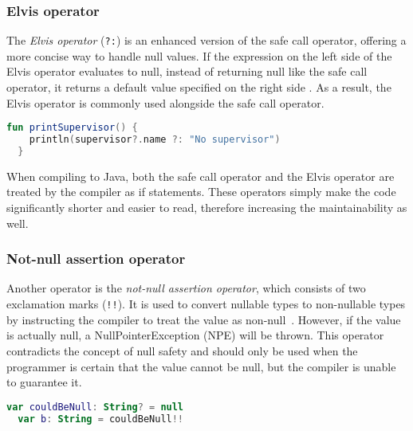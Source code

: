 \documentclass[a4paper, 11pt]{article}
\begin{document}
\subsubsection{Elvis operator}
The \textit{Elvis operator} (\texttt{?:}) is an enhanced version of the safe call operator, offering a more concise way to handle null values. If the expression on the left side of the Elvis operator evaluates to null, instead of returning null like the safe call operator, it returns a default value specified on the right side \cite{nullsafety-elvis}. As a result, the Elvis operator is commonly used alongside the safe call operator.

\begin{lstlisting}[language=Kotlin]
  fun printSupervisor() {
    println(supervisor?.name ?: "No supervisor")
  }
\end{lstlisting}

When compiling to Java, both the safe call operator and the Elvis operator are treated by the compiler as if statements. These operators simply make the code significantly shorter and easier to read, therefore increasing the maintainability as well.
 
\subsubsection{Not-null assertion operator}
Another operator is the \textit{not-null assertion operator}, which consists of two exclamation marks (\texttt{!!}). It is used to convert nullable types to non-nullable types by instructing the compiler to treat the value as non-null~\cite{nullsafety-assertion}. However, if the value is actually null, a NullPointerException (NPE) will be thrown. This operator contradicts the concept of null safety and should only be used when the programmer is certain that the value cannot be null, but the compiler is unable to guarantee it.

\begin{lstlisting}[language=Kotlin,title={Usage of the not-null assertion}]
  var couldBeNull: String? = null
  var b: String = couldBeNull!!
\end{lstlisting}
\end{document}
